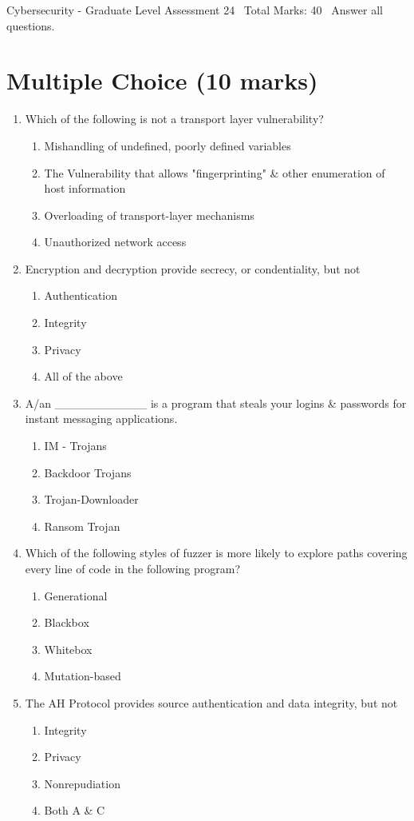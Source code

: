 \documentclass[12pt]{article}
\begin{document}
\begin{center}
Cybersecurity - Graduate Level Assessment 24 \
Total Marks: 40 \
Answer all questions.
\end{center}

\section*{Multiple Choice (10 marks)}
\begin{enumerate}[label=\arabic*.]
\item Which of the following is not a transport layer vulnerability?
\begin{enumerate}[label=(\alph*)]
    \item Mishandling of undefined, poorly defined variables
    \item The Vulnerability that allows "fingerprinting" \& other enumeration of host information
    \item Overloading of transport-layer mechanisms
    \item Unauthorized network access
\end{enumerate}
\item Encryption and decryption provide secrecy, or condentiality, but not
\begin{enumerate}[label=(\alph*)]
    \item Authentication
    \item Integrity
    \item Privacy
    \item All of the above
\end{enumerate}
\item A/an \_\_\_\_\_\_\_\_\_\_\_ is a program that steals your logins \& passwords for instant messaging applications.
\begin{enumerate}[label=(\alph*)]
    \item IM - Trojans
    \item Backdoor Trojans
    \item Trojan-Downloader
    \item Ransom Trojan
\end{enumerate}
\item Which of the following styles of fuzzer is more likely to explore paths covering every line of code in the following program?
\begin{enumerate}[label=(\alph*)]
    \item Generational
    \item Blackbox
    \item Whitebox
    \item Mutation-based
\end{enumerate}
\item The AH Protocol provides source authentication and data integrity, but not
\begin{enumerate}[label=(\alph*)]
    \item Integrity
    \item Privacy
    \item Nonrepudiation
    \item Both A \& C
\end{enumerate}
\end{enumerate}
\end{document}
